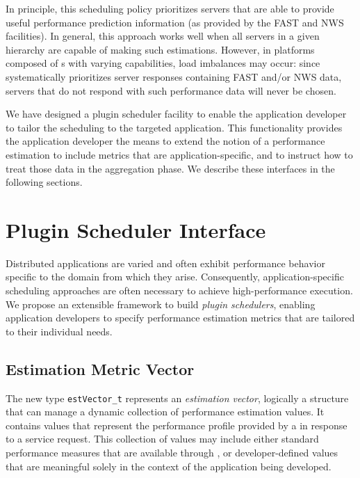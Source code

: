 In principle, this scheduling policy prioritizes servers that are able to
provide useful performance prediction information (as provided by the FAST and
NWS facilities). In general, this approach works well when all servers in a
given \diet hierarchy are capable of making such estimations. However, in
platforms composed of {\sed}s with varying capabilities, load imbalances may
occur: since \diet systematically prioritizes server responses containing FAST
and/or NWS data, servers that do not respond with such performance data will
never be chosen.

We have designed a plugin scheduler facility to enable the application
developer to tailor the \diet scheduling to the targeted application. This
functionality provides the application developer the means to extend the notion
of a performance estimation to include metrics that are application-specific,
and to instruct \diet how to treat those data in the aggregation phase.  We
describe these interfaces in the following sections.


\section{Plugin Scheduler Interface}

Distributed applications are varied and often exhibit performance behavior
specific to the domain from which they arise. Consequently,
application-specific scheduling approaches are often necessary to achieve
high-performance execution. We propose an extensible framework to build
\emph{plugin schedulers}, enabling application developers to specify
performance estimation metrics that are tailored to their individual needs.


\subsection{Estimation Metric Vector}\label{sect:estvector}

The new type \texttt{estVector\_t} represents an \emph{estimation vector},
logically a structure that can manage a dynamic collection of performance
estimation values. It contains values that represent the performance profile
provided by a {\sed} in response to a \diet service request. This collection of
values may include either standard performance measures that are available
through \diet, or developer-defined values that are meaningful solely in the
context of the application being developed.

